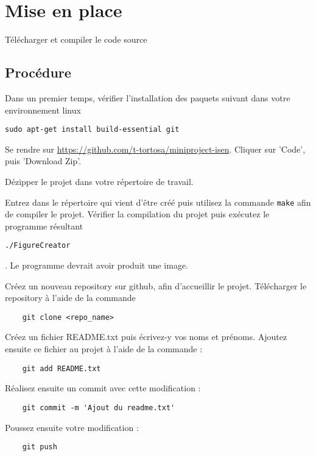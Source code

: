 \documentclass[
	12pt, %
]{fphw}
\begin{document}
\section*{Mise en place}

\begin{problem}
	Télécharger et compiler le code source
\end{problem}

\subsection*{Procédure}

Dans un premier temps, vérifier l'installation des paquets suivant dans votre environnement linux
\begin{verbatim}
sudo apt-get install build-essential git
\end{verbatim}

Se rendre sur \href{https://github.com/t-tortosa/miniproject-isen}{https://github.com/t-tortosa/miniproject-isen}. Cliquer sur 'Code', puis 'Download Zip'.

Dézipper le projet dans votre répertoire de travail.

Entrez dans le répertoire qui vient d'être créé puis utilisez la commande \verb"make" afin de compiler le projet.
Vérifier la compilation du projet puis exécutez le programme résultant \begin{verbatim}./FigureCreator\end{verbatim}. Le programme devrait avoir produit une image.

Créez un nouveau repository sur github, afin d'accueillir le projet. Télécharger le repository à l'aide de la commande 
\begin{verbatim}
	git clone <repo_name>
\end{verbatim}

Créez un fichier README.txt puis écrivez-y vos noms et prénoms. Ajoutez ensuite ce fichier au projet à l'aide de la commande :
\begin{verbatim}
	git add README.txt
\end{verbatim}

Réalisez ensuite un commit avec cette modification :
\begin{verbatim}
	git commit -m 'Ajout du readme.txt'
\end{verbatim}

Poussez ensuite votre modification :
\begin{verbatim}
	git push
\end{verbatim}
\end{document}
